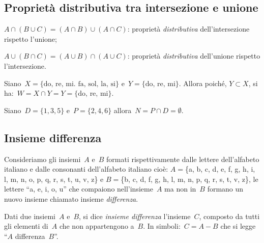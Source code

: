 \subsection[Proprietà distributiva]
{Proprietà distributiva tra intersezione e unione}

\begin{enumeratea}
\item $A\cap (B\cup C)=(A\cap B)\cup (A\cap C)$: 
proprietà \emph{distributiva} dell'intersezione rispetto l'unione;
\item $A\cup (B\cap C)=(A\cup B)\cap (A\cup C)$: 
proprietà \emph{distributiva} dell'unione rispetto l'intersezione.
\end{enumeratea}

\begin{exrig}
 \begin{esempio}
Siano~$X=\{\text{do, re, mi. fa, sol, la, si}\}$
e~$Y=\{\text{do, re, mi}\}$. Allora poiché, 
$Y\subset X$, si ha:~$W=X\cap Y=Y=\{\text{do, re, mi}\}$.
 \end{esempio}

 \begin{esempio}
Siano~$D=\{1,3,5\}$ e~$P=\{2,4,6\}$ allora~$N=P\cap D=\emptyset$.
\begin{center}
 
\end{center}
 \end{esempio}
\end{exrig}


\subsection{Insieme differenza}
\label{subsec:op_differenza}

Consideriamo gli insiemi~$A$ e~$B$ formati rispettivamente
dalle lettere dell'alfabeto italiano e dalle
consonanti dell'alfabeto italiano cioè:
$A=$\{a, b, c, d, e, f, g, h, i, l, m, n, o, p, q, r, s, t, u, v, z\} e
$B=$\{b, c, d, f, g, h, l, m, n, p, q, r, s, t, v, z\}, le lettere 
``a, e, i, o, u'' che compaiono nell'insieme~$A$ ma non in~$B$ formano un 
nuovo insieme chiamato insieme \emph{differenza}.

\begin{definizione}
 Dati due insiemi~$A$ e~$B$, si dice \emph{insieme differenza} l'insieme~$C$, 
 composto da tutti gli elementi di~$A$ che non appartengono a~$B$. 
 In simboli:~$C=A-B$ che si legge ``$A$ differenza~$B$''.
\end{definizione}

